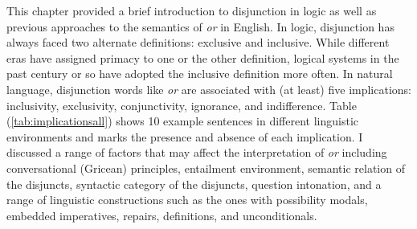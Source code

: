 \documentclass[oneside]{report}
\theoremstyle{definition}
\theoremstyle{definition}
\theoremstyle{definition}
\theoremstyle{remark}
\begin{document}
This chapter provided a brief introduction to disjunction in logic as
well as previous approaches to the semantics of \emph{or} in English. In
logic, disjunction has always faced two alternate definitions: exclusive
and inclusive. While different eras have assigned primacy to one or the
other definition, logical systems in the past century or so have adopted
the inclusive definition more often. In natural language, disjunction
words like \emph{or} are associated with (at least) five implications:
inclusivity, exclusivity, conjunctivity, ignorance, and indifference.
Table (\ref{tab:implicationsall}) shows 10 example sentences in
different linguistic environments and marks the presence and absence of
each implication. I discussed a range of factors that may affect the
interpretation of \emph{or} including conversational (Gricean)
principles, entailment environment, semantic relation of the disjuncts,
syntactic category of the disjuncts, question intonation, and a range of
linguistic constructions such as the ones with possibility modals,
embedded imperatives, repairs, definitions, and unconditionals.
\end{document}
